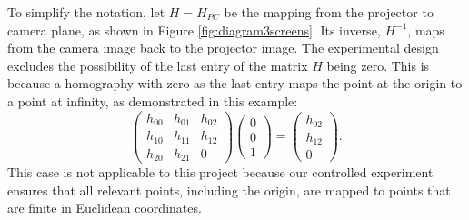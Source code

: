 \documentclass[11pt, oneside, reqno]{book}
\begin{document}
To simplify the notation, let $H=H_{PC}$ be the mapping from the projector to camera plane, as shown in Figure \ref{fig:diagram3screens}.
Its inverse, $H^{-1}$, maps from the camera image back to the projector image. The experimental design excludes the possibility of the last entry of the matrix $H$ being zero. This is because a homography with zero as the last entry maps the point at the origin to a point at infinity, as demonstrated in this example:
\[
\begin{pmatrix}
h_{00} & h_{01} & h_{02} \\
h_{10} & h_{11} & h_{12} \\
h_{20} & h_{21} & 0
\end{pmatrix}
\begin{pmatrix}
0 \\ 0 \\ 1
\end{pmatrix}
=
\begin{pmatrix}
h_{02} \\ h_{12} \\ 0
\end{pmatrix}.
\]
This case is not applicable to this project because our controlled experiment ensures that all relevant points, including the origin, are mapped to points that are finite in Euclidean coordinates.
\end{document}
